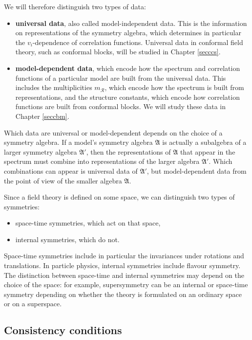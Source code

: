 \documentclass[12pt, a4paper, notitlepage, twoside]{report}
\numberwithin{equation}{section}
\theoremstyle{break}
\begin{document}
We will therefore distinguish two types of data:
\begin{itemize}
 \item \textbf{\boldmath universal data}, also called 
model-independent data.
This is the information on representations of the symmetry algebra, which determines in particular the $v_i$-dependence of correlation functions.
Universal data in conformal field theory, such as conformal blocks, will be studied in Chapter \ref{secccs}. 
\item \textbf{\boldmath model-dependent data}, which encode how the spectrum and correlation functions of a particular model are built from the universal data.
This includes the multiplicities $m_\mathcal{R}$, which encode how the spectrum is built from representations, and the structure constants, which encode how correlation functions are built from conformal blocks.
We will study these data 
in Chapter \ref{seccbm}.  
\end{itemize}
Which data are  universal or model-dependent depends on the choice of a symmetry algebra.
If a model's symmetry algebra $\mathfrak{A}$ is actually a subalgebra of a larger symmetry algebra $\mathfrak{A}'$, then the representations of $\mathfrak{A}$ that appear in the spectrum
must combine into representations of the larger algebra $\mathfrak{A}'$.
Which combinations can appear is universal data of $\mathfrak{A}'$, but model-dependent data from the point of view of the smaller algebra $\mathfrak{A}$. 

Since a field theory is defined on some space, we can distinguish two types of symmetries: 
\begin{itemize}
 \item space-time symmetries, which act on that space,
\item internal symmetries, which do not.
\end{itemize}
Space-time symmetries include in particular the invariances under rotations and translations.
In particle physics, internal symmetries include flavour symmetry.
The distinction between space-time and internal symmetries may depend on the choice of the space: for example, supersymmetry can be an internal or space-time symmetry depending on whether the theory is formulated on an ordinary space or on a superspace.

\subsection{Consistency conditions \label{seccc}}
\end{document}
